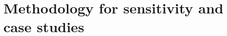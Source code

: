 \documentclass[gmd, manuscript]{copernicus}
\begin{document}
\begin{table}[btp]
\begin{tabular}{l c c l}
\hline\hline
\end{tabular}
\label{table:reaction_parameters}
\end{table}


\section{Methodology for sensitivity and case studies}
% 
\end{document}
